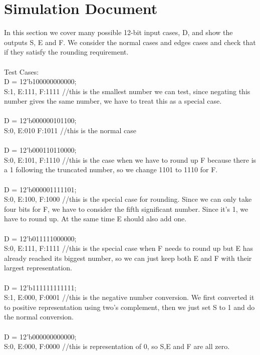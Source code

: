 \section*{Simulation Document}
In this section we cover many possible 12-bit input cases, D, and show the outputs S, E and F. We consider the normal cases and edges cases and check that if they satisfy the rounding requirement.
\\
\\
Test Cases:
\\
D = 12'b100000000000;  
\\
S:1, E:111, F:1111       //this is the smallest number we can test, since negating this number gives the same number, we have to treat this as a special case.
\\
\\
D = 12'b000000101100;
\\
S:0, E:010 F:1011        //this is the normal case
\\
\\
D = 12'b000110110000;
\\
S:0, E:101, F:1110       //this is the case when we have to round up F because there is a 1 following the truncated number, so we change 1101 to 1110 for F.
\\
\\
D = 12'b000001111101;
\\
S:0, E:100, F:1000       //this is the special case for rounding. Since we can only take four bits for F, we have to consider the fifth significant number. Since it's 1, we have to round up. At the same time E should also add one.
\\
\\
D = 12'b011111000000;
\\
S:0, E:111, F:1111       //this is the special case when F needs to round up but E has already reached its biggest number, so we can just keep both E and F with their largest representation.
\\
\\
D = 12'b111111111111;
\\
S:1, E:000, F:0001       //this is the negative number conversion. We first converted it to positive representation using two's complement, then we just set S to 1 and do the normal conversion.
\\
\\
D = 12'b000000000000;
\\
S:0, E:000, F:0000       //this is representation of 0, so S,E and F are all zero.
\\
